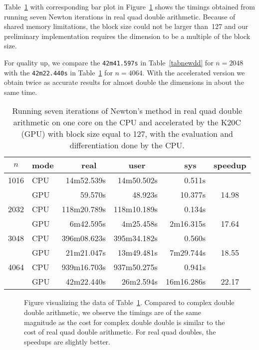 \documentclass{article}
\begin{document}
Table~\ref{tabnewqd} with corresponding bar plot in Figure~\ref{fignewqd}
shows the timings obtained from running
seven Newton iterations in real quad double arithmetic.
Because of shared memory limitations, the block size could not
be larger than~127 and our preliminary implementation requires
the dimension to be a multiple of the block size.

For quality up, we compare the {\tt 42m41.597s} in Table~\ref{tabnewdd}
for $n=2048$ with the {\tt 42m22.440s} in Table~\ref{tabnewqd}
for $n=4064$.  With the accelerated version we obtain twice as
accurate results for almost double the dimensions in about the same time.

\begin{table}[h!]
\begin{center}
\caption{Running seven iterations of Newton's method in real quad double
  arithmetic on one core on the CPU and 
  accelerated by the K20C (GPU) with block size equal to 127,
  with the evaluation and differentiation done by the CPU.}
\label{tabnewqd}
\begin{tabular}{cl|rrr|c}
$n$ & mode &      real~~  &    user ~~  &      sys~~ & speedup \\ \hline
1016 & CPU &   14m52.539s &  14m50.502s &     0.511s & \\
     & GPU &      59.570s &     48.923s &    10.377s & 14.98 \\ \hline
2032 & CPU &  118m20.789s & 118m10.189s &     0.134s & \\
     & GPU &    6m42.595s &   4m25.458s &  2m16.315s & 17.64 \\ \hline
3048 & CPU &  396m08.623s & 395m34.182s &     0.560s & \\
     & GPU &   21m21.047s &  13m49.481s &  7m29.744s & 18.55 \\ \hline
4064 & CPU &  939m16.703s & 937m50.275s &     0.941s & \\
     & GPU &   42m22.440s &   26m2.594s & 16m16.286s & 22.17 \\ 
\end{tabular}
\end{center}
\end{table}

\begin{figure}[hbt]
\begin{center}
\caption{Figure visualizing the data of Table~\ref{tabnewqd}.
Compared to complex double double arithmetic, we observe the timings
are of the same magnitude as the cost for complex double double is
similar to the cost of real quad double arithmetic.
For real quad doubles, the speedups are slightly better.}
\label{fignewqd}
\end{center}
\end{figure}
\end{document}
